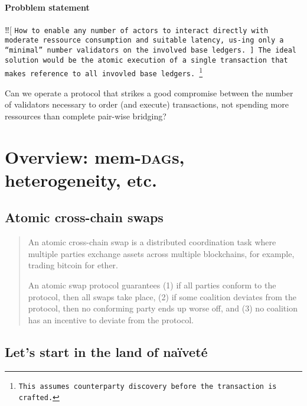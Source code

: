 \documentclass{article}
\theoremstyle{definition}
\newcommand{\Dag}[1][]{\textsc{dag}#1\xspace}
\begin{document}
\paragraph{Probblem statement%
}
‼[
\tt How to enable any number of actors to interact directly
with moderate ressource consumption and suitable latency, 
us-ing only a “minimal” number validators on the involved base ledgers.
%
]
The ideal solution would be 
the atomic execution of a single transaction that
makes reference to all invovled base ledgers.%
\footnote{%
  This assumes counterparty discovery 
  before the transaction  is crafted.
}%
\xspace
Can we operate a protocol
that strikes a good compromise between
the number of validators necessary to order (and execute) transactions,
not spending more ressources than complete pair-wise bridging?




\section{Overview: %
  mem-\Dag[s], heterogeneity, etc.}
\label{sec:overview}

\subsection{Atomic cross-chain swaps}
\label{sec:atom-trans-across}

\begin{quote}
  An atomic cross-chain swap is 
  a distributed coordination task 
  where multiple parties exchange assets across multiple blockchains, 
  for example, trading bitcoin for ether.

  An atomic swap protocol guarantees 
  (1) if all parties conform to the protocol, 
  then all swaps take place, 
  (2) if some coalition deviates from the protocol, 
  then no conforming party ends up worse off, and 
  (3) no coalition has an incentive to deviate from the protocol.
\end{quote}

\subsection{Let's start in the land of naïveté}
\label{sec:naivities}
\end{document}
